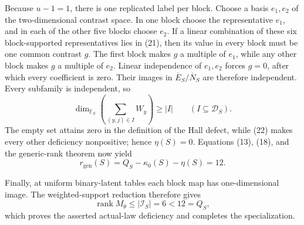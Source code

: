 Because \(u-1=1\), there is one replicated label per block.  Choose a basis \(e_1,e_2\) of the two-dimensional contrast space.  In one block choose the representative \(e_1\), and in each of the other five blocks choose \(e_2\).  If a linear combination of these six block-supported representatives lies in (21), then its value in every block must be one common contrast \(g\).  The first block makes \(g\) a multiple of \(e_1\), while any other block makes \(g\) a multiple of \(e_2\).  Linear independence of \(e_1,e_2\) forces \(g=0\), after which every coefficient is zero.  Their images in \(\overline E_S/\overline N_S\) are therefore independent.  Every subfamily is independent, so
\[
\dim_{\mathbb F_S}\left(\sum_{(y,j)\in I}W_y\right)\geq |I|
\qquad(I\subseteq\mathcal D_S).
\tag{22}
\]
The empty set attains zero in the definition of the Hall defect, while (22) makes every other deficiency nonpositive; hence \(\eta(S)=0\).  Equations (13), (18), and the generic-rank theorem now yield
\[
r_{\mathrm{gen}}(S)=Q_S-\kappa_0(S)-\eta(S)=12.
\tag{23}
\]

Finally, at uniform binary-latent tables each block map has one-dimensional image.  The weighted-support reduction therefore gives
\[
\operatorname{rank}M_\theta\leq|\mathcal I_S|=6<12=Q_S,
\tag{24}
\]
which proves the asserted actual-law deficiency and completes the specialization.
